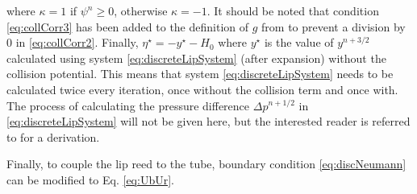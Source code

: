 %
where $\kappa = 1$ if $\psi^n \geq 0$, otherwise $\kappa = -1$. It should be noted that condition \eqref{eq:collCorr3} has been added to the definition of $g$ from \cite{Ducceschi2021} to prevent a division by 0 in \eqref{eq:collCorr2}. Finally, $\eta^\star = -y^{\star} - H_0$ where $y^{\star}$ is the value of $y^{n+3/2}$ calculated using system \eqref{eq:discreteLipSystem} (after expansion) without the collision potential. This means that system \eqref{eq:discreteLipSystem} needs to be calculated twice every iteration, once without the collision term and once with. The process of calculating the pressure difference $\Delta p^{n+1/2}$ in \eqref{eq:discreteLipSystem} will not be given here, but the interested reader is referred to \cite[Ch. 5]{Harrison2018} for a derivation.

Finally, to couple the lip reed to the tube, boundary condition \eqref{eq:discNeumann} can be modified to Eq. \eqref{eq:UbUr}. 

